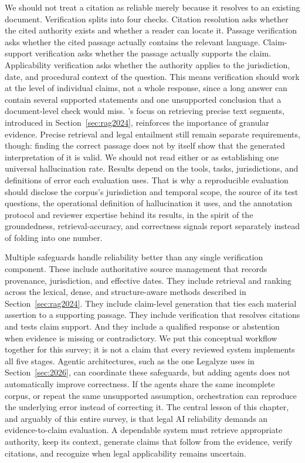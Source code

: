 We should not treat a citation as reliable merely because it resolves to an existing document.
Verification splits into four checks. Citation resolution asks whether the cited authority exists
and whether a reader can locate it. Passage verification asks whether the cited passage actually
contains the relevant language. Claim-support verification asks whether the passage actually
supports the claim. Applicability verification asks whether the authority applies to the
jurisdiction, date, and procedural context of the question. This means verification should work at
the level of individual claims, not a whole response, since a long answer can contain several
supported statements and one unsupported conclusion that a document-level check would miss.
\citet{pipitone2024}'s focus on retrieving precise text segments, introduced in
Section~\ref{sec:rag2024}, reinforces the importance of granular evidence. Precise retrieval and
legal entailment still remain separate requirements, though: finding the correct passage does not by
itself show that the generated interpretation of it is valid. We should not read either
\citet{dahl2024} or \citet{magesh2025} as establishing one universal hallucination rate. Results
depend on the tools, tasks, jurisdictions, and definitions of error each evaluation uses. That is
why a reproducible evaluation should disclose the corpus's jurisdiction and temporal scope, the
source of its test questions, the operational definition of hallucination it uses, and the
annotation protocol and reviewer expertise behind its results, in the spirit of the groundedness,
retrieval-accuracy, and correctness signals \citet{butler2026} report separately instead of folding
into one number.

Multiple safeguards handle reliability better than any single verification component. These
include authoritative source management that records provenance, jurisdiction, and effective dates.
They include retrieval and ranking across the lexical, dense, and structure-aware methods described
in Section~\ref{sec:rag2024}. They include claim-level generation that ties each material assertion
to a supporting passage. They include verification that resolves citations and tests claim support.
And they include a qualified response or abstention when evidence is missing or contradictory. We
put this conceptual workflow together for this survey; it is not a claim that every reviewed system
implements all five stages. Agentic architectures, such as the one Legalyze uses in
Section~\ref{sec:2026}, can coordinate these safeguards, but adding agents does not automatically
improve correctness. If the agents share the same incomplete corpus, or repeat the same unsupported
assumption, orchestration can reproduce the underlying error instead of correcting it. The central
lesson of this chapter, and arguably of this entire survey, is that legal AI reliability demands an
evidence-to-claim evaluation. A dependable system must retrieve appropriate authority, keep its
context, generate claims that follow from the evidence, verify citations, and recognize when legal
applicability remains uncertain.

